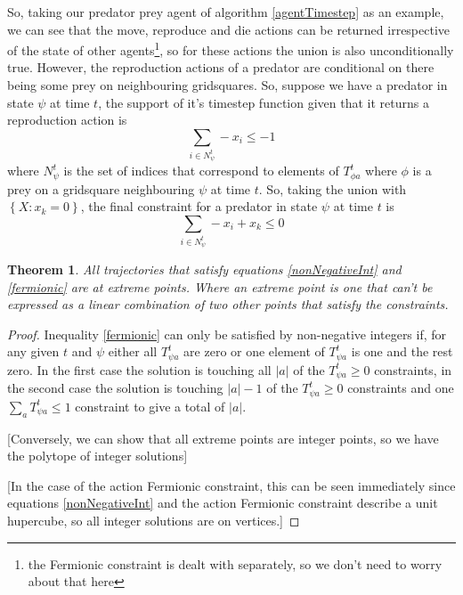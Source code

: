 \documentclass{article}
\newtheorem{theorem}{Theorem}
\begin{document}
So, taking our predator prey agent of algorithm \ref{agentTimestep} as an example, we can see that the move, reproduce and die actions can be returned irrespective of the state of other agents\footnote{the Fermionic constraint is dealt with separately, so we don't need to worry about that here}, so for these actions the union is also unconditionally true. However, the reproduction actions of a predator are conditional on there being some prey on neighbouring gridsquares. So, suppose we have a predator in state $\psi$ at time $t$, the support of it's timestep function given that it returns a reproduction action is
\[
\sum_{i \in N^t_\psi} -x_i \le -1
\]
where $N^t_\psi$ is the set of indices that correspond to elements of $T^t_{\phi a}$ where $\phi$ is a prey on a gridsquare neighbouring $\psi$ at time $t$. So, taking the union with $\left\{X: x_k = 0\right\}$, the final constraint for a predator in state $\psi$ at time $t$ is
\[
\sum_{i \in N^t_\psi} -x_i  + x_k  \le 0
\]

\begin{theorem}
	All trajectories that satisfy equations \eqref{nonNegativeInt} and \eqref{fermionic} are at extreme points. Where an extreme point is one that can't be expressed as a linear combination of two other points that satisfy the constraints.
\end{theorem}
\begin{proof}
	
	Inequality \eqref{fermionic} can only be satisfied by non-negative integers if, for any given $t$ and $\psi$ either all $T^t_{\psi a}$ are zero or one element of $T^t_{\psi a}$ is one and the rest zero. In the first case the solution is touching all $|a|$ of the $T^t_{\psi a} \ge 0$ constraints, in the second case the solution is touching $|a|-1$ of the $T^t_{\psi a} \ge 0$ constraints and one $\sum_a T^t_{\psi a} \le 1$ constraint to give a total of $|a|$.
	
	[Conversely, we can show that all extreme points are integer points, so we have the polytope of integer solutions]
	
	[In the case of the action Fermionic constraint, this can be seen immediately since equations \eqref{nonNegativeInt} and the action Fermionic constraint describe a unit hupercube, so all integer solutions are on vertices.]
	
\end{proof}

\end{document}
